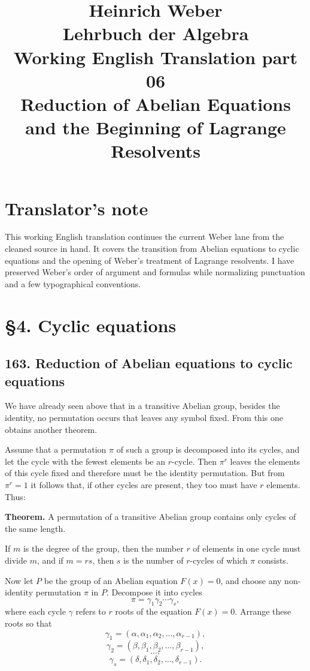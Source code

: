 \documentclass[11pt]{article}
\title{Heinrich Weber\\Lehrbuch der Algebra\\Working English Translation part 06\\Reduction of Abelian Equations and the Beginning of Lagrange Resolvents}
\author{}
\date{}
\begin{document}
\maketitle

\section*{Translator's note}
This working English translation continues the current Weber lane from the cleaned source in hand. It covers the transition from Abelian equations to cyclic equations and the opening of Weber's treatment of Lagrange resolvents. I have preserved Weber's order of argument and formulas while normalizing punctuation and a few typographical conventions.

\section*{\S 4. Cyclic equations}

\subsection*{163. Reduction of Abelian equations to cyclic equations}

We have already seen above that in a transitive Abelian group, besides the identity, no permutation occurs that leaves any symbol fixed. From this one obtains another theorem.

Assume that a permutation $\pi$ of such a group is decomposed into its cycles, and let the cycle with the fewest elements be an $r$-cycle. Then $\pi^r$ leaves the elements of this cycle fixed and therefore must be the identity permutation. But from $\pi^r = 1$ it follows that, if other cycles are present, they too must have $r$ elements. Thus:

\medskip
\noindent\textbf{Theorem.}
A permutation of a transitive Abelian group contains only cycles of the same length.

\medskip
If $m$ is the degree of the group, then the number $r$ of elements in one cycle must divide $m$, and if $m = rs$, then $s$ is the number of $r$-cycles of which $\pi$ consists.

Now let $P$ be the group of an Abelian equation $F(x)=0$, and choose any non-identity permutation $\pi$ in $P$. Decompose it into cycles
\[
\pi = \gamma_1\gamma_2\cdots\gamma_s,
\tag{1}
\]
where each cycle $\gamma$ refers to $r$ roots of the equation $F(x)=0$. Arrange these roots so that
\[
\gamma_1=(\alpha,\alpha_1,\alpha_2,\dots,\alpha_{r-1}),
\]
\[
\gamma_2=(\beta,\beta_1,\beta_2,\dots,\beta_{r-1}),
\]
\[
\dots,
\]
\[
\gamma_s=(\delta,\delta_1,\delta_2,\dots,\delta_{r-1}).
\tag{2}
\]
\end{document}
